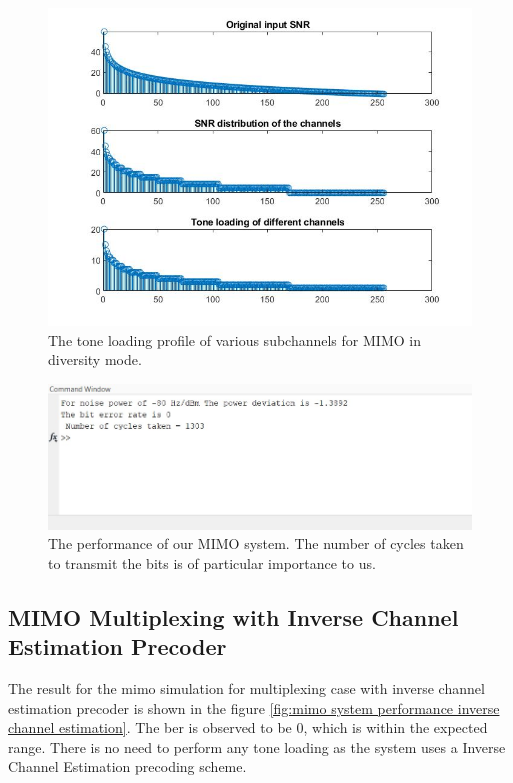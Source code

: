 \begin{figure}[!htbp]
\centering
\includegraphics[scale=0.7]{Chapter 4/Figures/MIMO Tone Loading Diversity}
\caption[MIMO Tone Loading in Diversity Case]{The tone loading profile of various subchannels for MIMO in diversity mode.}
\label{fig:mimo tone loading diversity}
\end{figure}

\begin{figure}[!htbp]
\centering
\includegraphics[scale=1]{Chapter 4/Figures/MIMO System Performance Diversity}
\caption[MIMO System Performance in Diversity Case]{The performance of our MIMO system. The number of cycles taken to transmit the bits is of particular importance to us.}
\label{fig:mimo system performance diversity}
\end{figure}

\subsection{MIMO Multiplexing with Inverse Channel Estimation Precoder}

The result for the \acrshort{mimo} simulation for multiplexing case with inverse channel estimation precoder is shown in the figure \ref{fig:mimo system performance inverse channel estimation}. The \acrshort{ber} is observed to be $0$, which is within the expected range. There is no need to perform any tone loading as the system uses a Inverse Channel Estimation precoding scheme.\\

